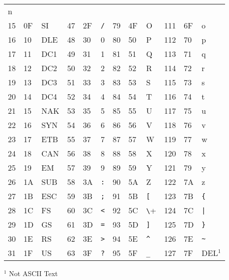 \documentclass[onecolumn]{aa}
\begin{document}
\begin{table}
\begin{center}
\begin{tabular}{|lll||lll|lll|lll|}
n        \\ 
15 & 0F & SI  & 47 & 2F & \verb+/+ & 79 & 4F & O        &111 & 6F & o 
      \\ 
16 & 10 & DLE & 48 & 30 & 0        & 80 & 50 & P        &112 & 70 & p  
     \\ 
17 & 11 & DC1 & 49 & 31 & 1        & 81 & 51 & Q        &113 & 71 & q  
     \\ 
18 & 12 & DC2 & 50 & 32 & 2        & 82 & 52 & R        &114 & 72 & r   
    \\ 
19 & 13 & DC3 & 51 & 33 & 3        & 83 & 53 & S        &115 & 73 & s   
    \\ 
20 & 14 & DC4 & 52 & 34 & 4        & 84 & 54 & T        &116 & 74 & t   
    \\ 
21 & 15 & NAK & 53 & 35 & 5        & 85 & 55 & U        &117 & 75 & u  
     \\ 
22 & 16 & SYN & 54 & 36 & 6        & 86 & 56 & V        &118 & 76 & v   
    \\ 
23 & 17 & ETB & 55 & 37 & 7        & 87 & 57 & W        &119 & 77 & w 
      \\ 
24 & 18 & CAN & 56 & 38 & 8        & 88 & 58 & X        &120 & 78 & x   
    \\ 
25 & 19 & EM  & 57 & 39 & 9        & 89 & 59 & Y        &121 & 79 & y   
    \\ 
26 & 1A & SUB & 58 & 3A & \verb+:+ & 90 & 5A & Z        &122 & 7A &
z        \\ 
27 & 1B & ESC & 59 & 3B & \verb+;+ & 91 & 5B & \verb+[+ &123 & 7B
& \verb+{+ \\ 
28 & 1C & FS  & 60 & 3C & \verb+<+ & 92 & 5C & \verb+\+ &124 & 7C
& \verb+|+ \\ 
29 & 1D & GS  & 61 & 3D & \verb+=+ & 93 & 5D & \verb+]+ &125 & 7D
& \verb+}+ \\ 
30 & 1E & RS  & 62 & 3E & \verb+>+ & 94 & 5E & \verb+^+ &126 &
7E & \verb+~+ \\ 
31 & 1F & US  & 63 & 3F & \verb+?+ & 95 & 5F & \verb+_+ &127 & 7F
& DEL$^{1}$ \\
\hline                            
\end{tabular}                     
\end{center}
$^1$ Not ASCII Text                     
\label{t:ascii}                   
\end{table}                       

         


\end{document}
